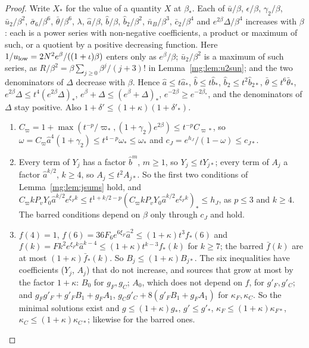 \documentclass[11pt,a4paper]{article}
\theoremstyle{definition}
\theoremstyle{remark}
\begin{document}
\begin{proof}
Write $X_*$ for the value of a quantity $X$ at $\beta_*$. Each of $\bar u/\beta$, $\epsilon/\beta$, $\gamma_2/\beta$, $\bar u_2/\beta^2$, $\bar\sigma_6/\beta^6$, $\bar\theta/\beta^6$, $\lambda$, $\hat a/\beta$, $\hat b/\beta$,
$\hat b_2/\beta^2$, $\bar n_B/\beta^3$, $\bar c_2/\beta^4$ and $e^{2\beta}\Delta/\beta^4$ increases with $\beta$: each is a power series with non-negative coefficients, a product or maximum of such, or a
quotient by a positive decreasing function. Here $1/u_{\rm low}=2N^2e^\beta/((1+\iota)\beta)$ enters only as $e^\beta/\beta$; $\bar u_2/\beta^2$ is a maximum of such series, as
$R/\beta^2=\beta\sum_{j\ge0}\beta^j/(j+3)!$ in Lemma~\ref{mg:lem:u2sun}; and the two denominators of $\Delta$ decrease with $\beta$. Hence $\hat a\le t\hat a_*$, $\hat b\le t\hat b_*$, $\hat b_2\le t^2\hat b_{2*}$,
$\bar\theta\le t^6\bar\theta_*$, $e^{2\beta}\Delta\le t^4(e^{2\beta}\Delta)_*$, $e^\beta+\Delta\le(e^\beta+\Delta)_*$, $e^{-2\beta}\ge e^{-2\beta_*}$, and the denominators of $\Delta$ stay positive. Also
$1+\delta'\le(1+\kappa)(1+\delta'_*)$.
\begin{enumerate}[label=(\alph*)]
\item $C_\varpi=1+\max(t^{-p}/\varpi_*,(1+\gamma_2)e^{2\beta})\le t^{-p}C_{\varpi*}$, so $\omega=C_\varpi\hat a^4(1+\gamma_2)\le t^{4-p}\omega_*\le\omega_*$ and $c_J=e^{h_J}/(1-\omega)\le c_{J*}$.
\item Every term of $Y_j$ has a factor $\hat b^m$, $m\ge1$, so $Y_j\le tY_{j*}$; every term of $A_j$ a factor $\hat a^{k/2}$, $k\ge4$, so $A_j\le t^2A_{j*}$. So the first two conditions of
Lemma~\ref{mg:lem:jsums} hold, and $C_\varpi kP_vY_0\hat a^{k/2}e^{\xi_Fk}\le t^{1+k/2-p}(C_\varpi kP_vY_0\hat a^{k/2}e^{\xi_Fk})_*\le h_J$, as $p\le3$ and $k\ge4$. The barred conditions depend on $\beta$ only
through $c_J$ and hold.
\item $f(4)=1$, $f(6)=36F_6e^{6\xi_F}\hat a^2\le(1+\kappa)t^3f_*(6)$ and $f(k)=Fk^2e^{\xi_Fk}\hat a^{k-4}\le(1+\kappa)t^{k-3}f_*(k)$ for $k\ge7$; the barred $\bar f(k)$ are at most $(1+\kappa)\bar f_*(k)$. So
$B_j\le(1+\kappa)B_{j*}$. The six inequalities have coefficients ($Y_j$, $A_j$) that do not increase, and sources that grow at most by the factor $1+\kappa$: $B_0$ for $g_F,g_C$; $A_0$, which does
not depend on $f$, for $g'_F,g'_C$; and $g_Fg'_F+g'_FB_1+g_FA_1$, $g_Cg'_C+8(g'_FB_1+g_FA_1)$ for $\kappa_F,\kappa_C$. So the minimal solutions exist and $g\le(1+\kappa)g_*$, $g'\le g'_*$,
$\kappa_F\le(1+\kappa)\kappa_{F*}$, $\kappa_C\le(1+\kappa)\kappa_{C*}$; likewise for the barred ones.

\end{enumerate}
\end{proof}
\end{document}

